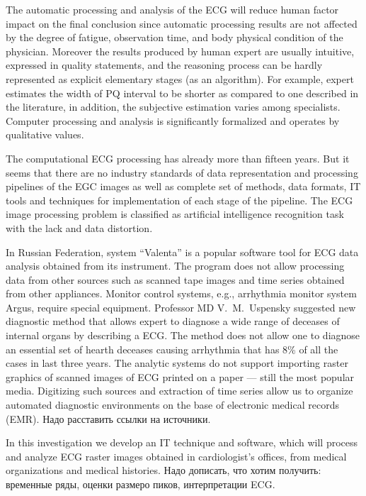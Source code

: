 \documentclass[runningheads]{AIIT}
\newcommand{\nnn}[2][rcolor]{\noindent%
\textcolor{eclr}{}\textcolor{#1}{#2}\textcolor{eclr}{}}
\begin{document}
The automatic processing and analysis of the ECG will reduce human factor impact on the final conclusion since automatic processing results are not affected by the degree of fatigue, observation time, and body physical condition of the physician.  Moreover the results produced by human expert are usually intuitive, expressed in quality statements, and the reasoning process can be hardly represented as explicit elementary stages (as an algorithm).  For example, expert estimates the width of PQ interval to be shorter as compared to one described in the literature, in addition, the subjective estimation varies among specialists. \cite{rangaraj}  Computer processing and analysis is significantly formalized and operates by qualitative values.

The computational ECG processing has already more than fifteen years.  But it seems that there are no industry standards of data representation and processing pipelines of the EGC images as well as complete set of methods, data formats, IT tools and techniques for implementation of each stage of the pipeline.  The ECG image processing problem is classified as artificial intelligence recognition task with the lack and data distortion.

In Russian Federation, system ``Valenta'' is a popular software tool for ECG data analysis obtained from its instrument.  The program does not allow processing data from other sources such as scanned tape images and time series obtained from other appliances.  Monitor control systems, e.g., arrhythmia monitor system Argus, require special equipment.  Professor MD V.~M.~Uspensky suggested new diagnostic method that allows expert to diagnose a wide range of deceases of internal organs by describing a ECG.  The method does not allow one to diagnose an essential set of hearth deceases causing arrhythmia that has 8\% of all the cases in last three years.  The analytic systems do not support importing raster graphics of scanned images of ECG printed on a paper --- still the most popular media.  Digitizing such sources and extraction of time series allow us to organize automated diagnostic environments on the base of electronic medical records (EMR). \nnn{Надо расставить ссылки на источники.}

In this investigation we develop an IT technique and software, which will process and analyze ECG raster images obtained in cardiologist's offices, from medical organizations and medical histories. \nnn{Надо дописать, что хотим получить: временные ряды, оценки размеро пиков, интерпретации ECG.}
\end{document}
